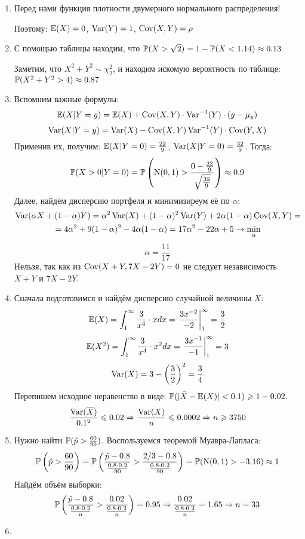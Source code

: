 \begin{enumerate}
\item Перед нами функция плотности двумерного нормального распределения!

Поэтому: $\E(X) = 0$, $\Var(Y)=1$, $\Cov(X, Y) = \rho$
\item С помощью таблицы находим, что $\P(X > \sqrt{2}) = 1 - \P(X<1.14) \approx 0.13$

Заметим, что $X^2 + Y^2 \sim \chi^2_2$, и находим искомую вероятность по таблице: $\P(X^2 + Y^2 >4) \approx 0.87$

\item Вспомним важные формулы:
\[
\E(X | Y = y) = \E(X) + \Cov(X, Y) \cdot \Var^{-1}(Y) \cdot (y - \mu_y)
\]
\[
\Var(X | Y = y) = \Var(X) - \Cov(X, Y) \Var^{-1}(Y) \cdot \Cov(Y, X)
\]
Применив их, получим: $\E(X | Y = 0) = \frac{22}{9}$, $\Var(X | Y = 0) = \frac{32}{9}$. Тогда:
\[
\P(X > 0 | Y = 0) = \P\left(\cN(0,1) > \frac{0 - \frac{22}{9}}{\sqrt{\frac{32}{9}}}\right) \approx 0.9
\]
Далее, найдём дисперсию портфеля и минимизиреум её по $\alpha$:
\begin{multline*}
\Var(\alpha X + (1-\alpha) Y) = \alpha^2 \Var(X) + (1-\alpha)^2 \Var(Y) + 2 \alpha (1-\alpha) \Cov(X, Y) =\\
= 4 \alpha^2 + 9(1-\alpha)^2 -4\alpha(1-\alpha)  = 17 \alpha^2 - 22 \alpha + 5 \to \min_{\alpha}
\end{multline*}
\[
\alpha = \frac{11}{17}
\]
Нельзя, так как из $\Cov(X+Y, 7X - 2Y) = 0$ не следует независимость $X+Y$ и $7X - 2Y$.
\item Сначала подготовимся и найдём дисперсию случайной величины $X$:
\[
\E(X) = \int_1^{\infty} \frac{3}{x^4} \cdot x dx = \left. \frac{3x^{-2}}{-2} \right|_1^{\infty} = \frac{3}{2}
\]
\[
\E(X^2) = \int_1^{\infty} \frac{3}{x^4} \cdot x^2 dx = \left. \frac{3x^{-1}}{-1} \right|_1^{\infty} = 3
\]
\[
\Var(X) = 3 - \left(\frac{3}{2}\right)^2 = \frac{3}{4}
\]
Перепишем исходное неравенство в виде: $\P(|\bar{X} -\E(X)|<0.1) \geq 1 - 0.02$.
\[
\frac{\Var(\overline{X})}{0.1^2} \leq 0.02 \Rightarrow \frac{\Var(X)}{n} \leq 0.0002 \Rightarrow n \geq 3750
\]
\item Нужно найти $\P(\hat{p} > \frac{60}{90})$. Воспользуемся теоремой Муавра-Лапласа:
\[
\P\left(\hat{p} > \frac{60}{90}\right) = \P \left(\frac{\hat{p} - 0.8}{\frac{0.8 \cdot 0.2}{90}} > \frac{2/3 - 0.8}{\frac{0.8 \cdot 0.2}{90}} \right) = \P(\cN(0,1) > -3.16) \approx 1
\]
Найдём объём выборки:
\[
\P \left(\frac{\hat{p} - 0.8}{\frac{0.8 \cdot 0.2}{n}} > \frac{0.02}{\frac{0.8 \cdot 0.2}{n}} \right) = 0.95 \Rightarrow \frac{0.02}{\frac{0.8 \cdot 0.2}{n}} = 1.65 \Rightarrow n =33
\]
\item %


\end{enumerate}
